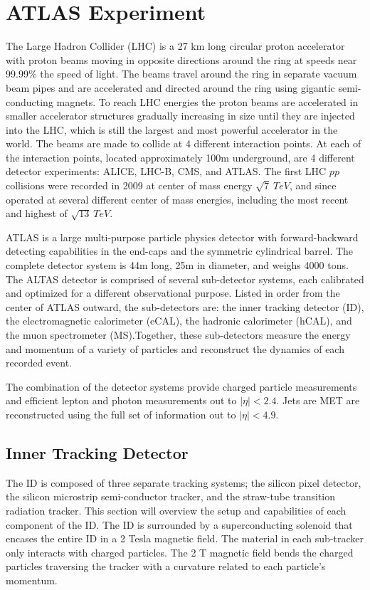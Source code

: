\chapter{ATLAS Experiment}
The Large Hadron Collider (LHC) is a 27 km long circular proton accelerator with proton beams moving in opposite directions around the ring at speeds near 99.99\% the speed of light.  The beams travel around the ring in separate vacuum beam pipes and are accelerated and directed around the ring using gigantic semi-conducting magnets.  To reach LHC energies the proton beams are accelerated in smaller accelerator structures gradually increasing in size until they are injected into the LHC, which is still the largest and most powerful accelerator in the world.  The beams are made to collide at 4 different interaction points.  At each of the interaction points, located approximately 100m underground, are 4 different detector experiments: ALICE, LHC-B, CMS, and ATLAS.  The first LHC $pp$ collisions were recorded in 2009 at center of mass energy $\sqrt{7}~TeV$, and since operated at several different center of mass energies, including the most recent and highest of $\sqrt{13}~TeV$.

ATLAS is a large multi-purpose particle physics detector with forward-backward detecting capabilities in the end-caps and the symmetric cylindrical barrel.  The complete detector system is 44m long, 25m in diameter, and weighs 4000 tons.  The ALTAS detector is comprised of several sub-detector systems, each calibrated and optimized for a different observational purpose.  Listed in order from the center of ATLAS outward, the sub-detectors are: the inner tracking detector (ID), the electromagnetic calorimeter (eCAL), the hadronic calorimeter (hCAL), and the muon spectrometer (MS).Together, these sub-detectors measure the energy and momentum of a variety of particles and reconstruct the dynamics of each recorded event.

The combination of the detector systems provide charged particle measurements and efficient lepton and photon measurements out to $|\eta| < 2.4$.  Jets are MET are reconstructed using the full set of information out to $|\eta| < 4.9$.  

\section{Inner Tracking Detector}
The ID is composed of three separate tracking systems; the silicon pixel detector, the silicon microstrip semi-conductor tracker, and the straw-tube transition radiation tracker.  This section will overview the setup and capabilities of each component of the ID.  The ID is surrounded by a superconducting solenoid that encases the entire ID in a 2 Tesla magnetic field.  The material in each sub-tracker only interacts with charged particles.  The 2 T magnetic field bends the charged particles traversing the tracker with a curvature related to each particle's momentum.
